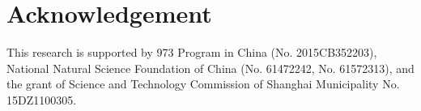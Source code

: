 \section*{Acknowledgement}
This research is supported by 973 Program in China (No. 2015CB352203), National Natural Science Foundation of China (No. 61472242, No. 61572313), and the grant of Science and Technology Commission of Shanghai Municipality No. 15DZ1100305.